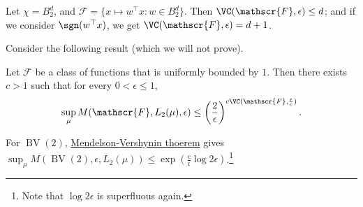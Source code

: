 \begin{eg}\label{eg:lec16}
	Let \(\chi = B_2^d\), and \(\mathscr{F} = \{ x \mapsto w^{\top} x \colon w\in B_2^d \} \). Then \(\VC(\mathscr{F} , \epsilon ) \leq d\); and if we consider \(\sgn (w^{\top} x)\), we get \(\VC(\mathscr{F} , \epsilon ) = d+1\).
\end{eg}

Consider the following result (which we will not prove).

\begin{theorem}\label{thm:Mendelson-Vershynin}
	Let \(\mathscr{F} \) be a class of functions that is uniformly bounded by \(1\). Then there exists \(c > 1\) such that for every \(0 < \epsilon \leq 1\),
	\[
		\sup _\mu M(\mathscr{F} , L_2(\mu ), \epsilon) \leq \left( \frac{2}{\epsilon } \right) ^{c \VC(\mathscr{F} , \frac{\epsilon}{c})}.
	\]
\end{theorem}

\begin{remark}
	For \(\mathop{\mathrm{BV}}(2) \), \hyperref[thm:Mendelson-Vershynin]{Mendelson-Vershynin thoerem} gives \(\sup _\mu M(\mathop{\mathrm{BV}}(2) , \epsilon , L_2(\mu )) \leq \exp (\frac{c}{\epsilon } \log 2\epsilon )\).\footnote{Note that \(\log 2\epsilon \) is superfluous again.}
\end{remark}
